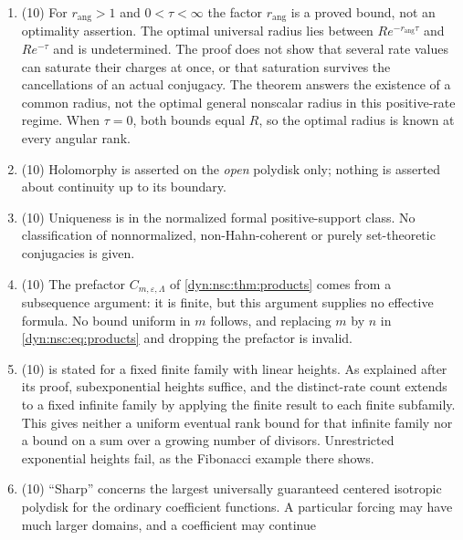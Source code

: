 \documentclass[11pt,letterpaper]{article}
\theoremstyle{definition}
\theoremstyle{remark}
\newcommand{\eps}{\varepsilon}
\newcommand{\rang}{r_{\mathrm{ang}}}
\numberwithin{equation}{section}
\begin{document}
\begin{enumerate}[label=\textbf{N\arabic*.},ref=\textbf{N\arabic*},leftmargin=3.2em,start=109]
\cite{FMS26,CarlettiLagrange}, surreal normal forms \cite{Gonshor}, Cauchy
estimates, the root test, elementary continued fractions including the
prescribed-rate family, and the algebraic-number estimate of
\cref{dyn:nsc:ex:ranktwo}. The scalar common-domain theorem and the scalar
fixed-complexity rate are already in this report and are not claimed; the
general upper bound $Re^{-\tau}$ and the $\tau=\infty$ obstruction are
first-weight obstructions already here, included only to complete the
criterion.
\item\label{dyn:nsc:nc:gap} (10) For $\rang>1$ and $0<\tau<\infty$ the
factor $\rang$ is a
proved bound, not an optimality assertion. The optimal universal radius lies
between $Re^{-\rang\tau}$ and $Re^{-\tau}$ and is undetermined. The proof
does not show that several rate values can saturate their charges at once,
or that saturation survives the cancellations of an actual conjugacy. The
theorem answers the existence of a common radius, not the optimal general
nonscalar radius in this positive-rate regime. When $\tau=0$, both bounds
equal $R$, so the optimal radius is known at every angular rank.
\item (10) Holomorphy is asserted on the \emph{open} polydisk only; nothing is
asserted about continuity up to its boundary.
\item (10) Uniqueness is in the normalized formal positive-support class. No
classification of nonnormalized, non-Hahn-coherent or purely set-theoretic
conjugacies is given.
\item (10) The prefactor $C_{m,\eps,\Lambda}$ of \cref{dyn:nsc:thm:products}
comes from a subsequence argument: it is finite, but this argument supplies
no effective formula. No bound uniform in $m$ follows, and replacing $m$ by $n$ in
\eqref{dyn:nsc:eq:products} and dropping the prefactor is invalid.
\item (10)  is stated for a fixed finite family
with linear heights. As explained after its proof, subexponential heights
suffice, and the distinct-rate count extends to a fixed infinite family by
applying the finite result to each finite subfamily. This gives neither a
uniform eventual rank bound for that infinite family nor a bound on a sum
over a growing number of divisors. Unrestricted exponential heights fail,
as the Fibonacci example there shows.
\item (10) ``Sharp'' concerns the largest universally guaranteed centered
isotropic polydisk for the ordinary coefficient functions. A particular
forcing may have much larger domains, and a coefficient may continue

\end{enumerate}
\end{document}
